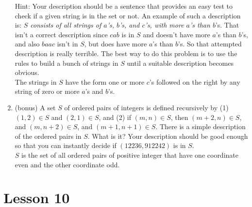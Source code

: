 \documentclass[11pt]{amsart}
\begin{document}
\begin{enumerate}
Hint: Your description should be a sentence that provides an easy test to check if a given string
is in the set or not. An example of such a description is: {\it $S$ consists of all strings of $a$'s, $b$'s, and $c$'s,
with more $a$'s than $b$}'s. That isn't a correct description since $cab$ is in $S$ and doesn't have more $a$'s than
$b$'s, and also $baac$ isn't in $S$, but does have more $a$'s than $b$'s. So that attempted description is really 
terrible. The best way to do this problem is to use the rules to build a bunch of strings in $S$ until a suitable
description becomes obvious.\\[3pt]

{\color{blue} The strings in $S$ have the form one or more $c$'s followed on the right by any
string of zero or more $a$'s and $b$'s.\\[5pt]}

\item (bonus)  A set $S$ of ordered pairs of integers is defined recursively
by (1) $(1,2)\in S$  and $(2,1)\in S$,  and (2) if $(m,n)\in S$, then $(m+2,n)\in S$, and
$(m,n+2)\in S$, and $(m+1,n+1)\in S$. There is a simple description
of the ordered pairs in $S$. What is it?  Your description should be good enough so that 
you can instantly decide if $(12236, 912242)$ is in $S$. \\[3pt]

{\color{blue} $S$ is the set of all ordered pairs of positive integer 
that have one coordinate even and the other coordinate odd.\\[5pt]}


\end{enumerate}

\section{Lesson 10}
\end{document}
